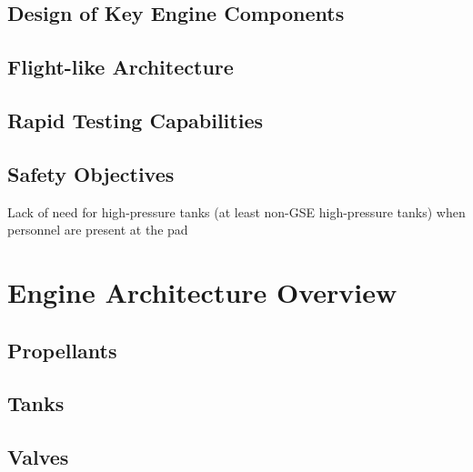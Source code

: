 \documentclass[12pt, letterpaper]{article}
\begin{document}
\subsection{Design of Key Engine Components}
\subsection{Flight-like Architecture}
\subsection{Rapid Testing Capabilities}
\subsection{Safety Objectives}
Lack of need for high-pressure tanks (at least non-GSE high-pressure tanks) when personnel are present at the pad

\section{Engine Architecture Overview}
\subsection{Propellants}
\subsection{Tanks}
\subsection{Valves}
\end{document}
